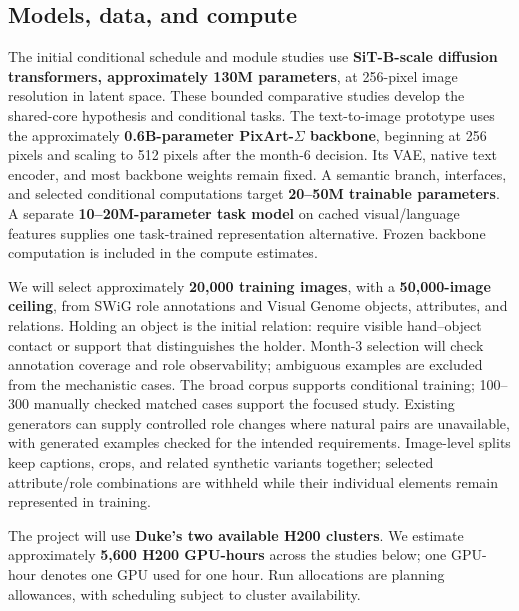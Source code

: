 \documentclass[11pt,letterpaper]{article}
\begin{document}
\hypertarget{models-data-and-compute}{%
\subsection{Models, data, and compute}\label{models-data-and-compute}}

The initial conditional schedule and module studies use \textbf{SiT-B-scale diffusion transformers, approximately 130M parameters}, at 256-pixel image resolution in latent space. These bounded comparative studies develop the shared-core hypothesis and conditional tasks. The text-to-image prototype uses the approximately \textbf{0.6B-parameter PixArt-\(\Sigma\) backbone}, beginning at 256 pixels and scaling to 512 pixels after the month-6 decision. Its VAE, native text encoder, and most backbone weights remain fixed. A semantic branch, interfaces, and selected conditional computations target \textbf{20--50M trainable parameters}. A separate \textbf{10--20M-parameter task model} on cached visual/language features supplies one task-trained representation alternative. Frozen backbone computation is included in the compute estimates.

We will select approximately \textbf{20,000 training images}, with a \textbf{50,000-image ceiling}, from SWiG \citep{swig} role annotations and Visual Genome \citep{visualgenome} objects, attributes, and relations. Holding an object is the initial relation: require visible hand--object contact or support that distinguishes the holder. Month-3 selection will check annotation coverage and role observability; ambiguous examples are excluded from the mechanistic cases. The broad corpus supports conditional training; 100--300 manually checked matched cases support the focused study. Existing generators can supply controlled role changes where natural pairs are unavailable, with generated examples checked for the intended requirements. Image-level splits keep captions, crops, and related synthetic variants together; selected attribute/role combinations are withheld while their individual elements remain represented in training.


The project will use \textbf{Duke's two available H200 clusters}. We estimate approximately \textbf{5,600 H200 GPU-hours} across the studies below; one GPU-hour denotes one GPU used for one hour. Run allocations are planning allowances, with scheduling subject to cluster availability.
\end{document}

